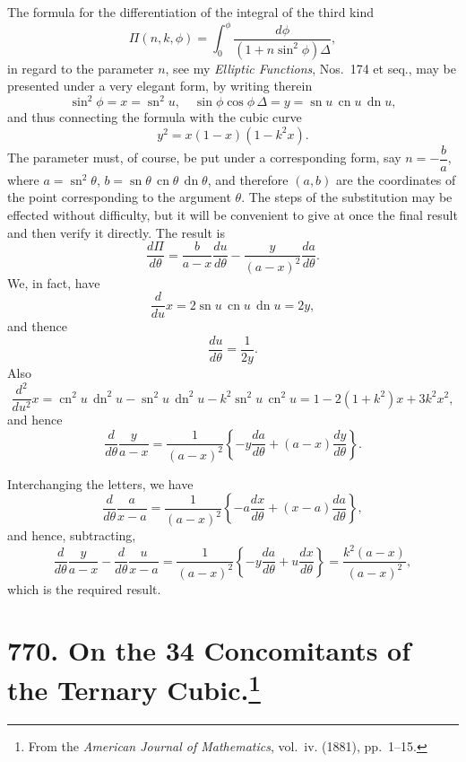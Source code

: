\documentclass[11pt,a4paper]{article}
\theoremstyle{definition}
\begin{document}
The formula for the differentiation of the integral of the third kind
\[
\Pi(n, k, \phi) = \int_0^\phi \frac{d\phi}{(1 + n\sin^2\phi)\Delta},
\]
in regard to the parameter $n$, see my \textit{Elliptic Functions}, Nos.~174 et seq., may be presented under a very elegant form, by writing therein
\[
\sin^2\phi = x = \operatorname{sn}^2 u,\quad \sin\phi\cos\phi\,\Delta = y = \operatorname{sn}u\,\operatorname{cn}u\,\operatorname{dn}u,
\]
and thus connecting the formula with the cubic curve
\[
y^2 = x(1 - x)(1 - k^2x).
\]
The parameter must, of course, be put under a corresponding form, say $n = -\dfrac{b}{a}$, where $a = \operatorname{sn}^2\theta$, $b = \operatorname{sn}\theta\,\operatorname{cn}\theta\,\operatorname{dn}\theta$, and therefore $(a, b)$ are the coordinates of the point corresponding to the argument $\theta$. The steps of the substitution may be effected without difficulty, but it will be convenient to give at once the final result and then verify it directly. The result is
\[
\frac{d\Pi}{d\theta} = \frac{b}{a - x} \frac{du}{d\theta} - \frac{y}{(a - x)^2} \frac{da}{d\theta}.
\]
We, in fact, have
\[
\frac{d}{du} x = 2\operatorname{sn}u\,\operatorname{cn}u\,\operatorname{dn}u = 2y,
\]
and thence
\[
\frac{du}{d\theta} = \frac{1}{2y}.
\]
Also
\[
\frac{d^2}{du^2} x = \operatorname{cn}^2u\,\operatorname{dn}^2u - \operatorname{sn}^2u\,\operatorname{dn}^2u - k^2\operatorname{sn}^2u\,\operatorname{cn}^2u = 1 - 2(1 + k^2)x + 3k^2x^2,
\]
and hence
\[
\frac{d}{d\theta}\frac{y}{a - x} = \frac{1}{(a - x)^2}\left\{-y\frac{da}{d\theta} + (a - x)\frac{dy}{d\theta}\right\}.
\]

Interchanging the letters, we have
\[
\frac{d}{d\theta}\frac{a}{x - a} = \frac{1}{(a - x)^2}\left\{-a\frac{dx}{d\theta} + (x - a)\frac{da}{d\theta}\right\},
\]
and hence, subtracting,
\[
\frac{d}{d\theta}\frac{y}{a - x} - \frac{d}{d\theta}\frac{u}{x - a} = \frac{1}{(a - x)^2}\left\{-y\frac{da}{d\theta} + u\frac{dx}{d\theta}\right\} = \frac{k^2(a - x)}{(a - x)^2},
\]
which is the required result.

\newpage
\section[On the 34 Concomitants of the Ternary Cubic]{770. On the 34 Concomitants of the Ternary Cubic.\footnote{From the \textit{American Journal of Mathematics}, vol.~iv. (1881), pp.~1--15.}}
\end{document}
